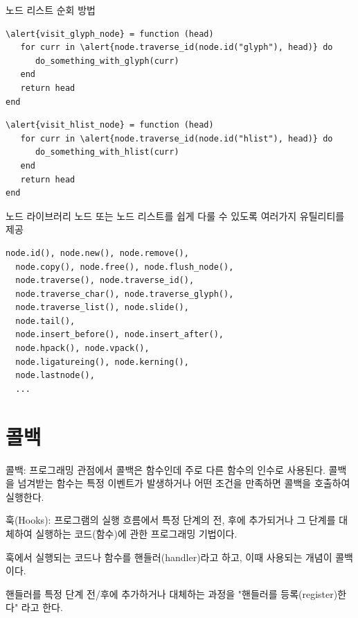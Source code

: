 \documentclass[t,10pt]{beamer}
\begin{document}
\begin{frame}[fragile]{노드 리스트 순회 방법}
\begin{Verbatim}[fontsize=\small,commandchars=\\\{\}]
\alert{visit_glyph_node} = function (head)
   for curr in \alert{node.traverse_id(node.id("glyph"), head)} do
      do_something_with_glyph(curr)
   end
   return head
end
\end{Verbatim}

\begin{Verbatim}[fontsize=\small,commandchars=\\\{\}]
\alert{visit_hlist_node} = function (head)
   for curr in \alert{node.traverse_id(node.id("hlist"), head)} do
      do_something_with_hlist(curr)
   end
   return head
end
\end{Verbatim}
\end{frame}

\begin{frame}[fragile]{노드 라이브러리}
  노드 또는 노드 리스트를 쉽게 다룰 수 있도록 여러가지 유틸리티를 제공

\begin{Verbatim}[fontsize=\small]
  node.id(), node.new(), node.remove(),
  node.copy(), node.free(), node.flush_node(),
  node.traverse(), node.traverse_id(),
  node.traverse_char(), node.traverse_glyph(),
  node.traverse_list(), node.slide(),
  node.tail(),
  node.insert_before(), node.insert_after(),
  node.hpack(), node.vpack(),
  node.ligatureing(), node.kerning(),
  node.lastnode(),
  ...
\end{Verbatim}
\end{frame}

\section{콜백}

\begin{frame}[fragile]{콜백: 프로그래밍 관점에서}
  콜백은 함수인데 주로 다른 함수의 인수로 사용된다. 콜백을 넘겨받는 함수는
  특정 이벤트가 발생하거나 어떤 조건을 만족하면 콜백을 호출하여 실행한다.

  \alert{훅(Hooks)}: 프로그램의 실행 흐름에서 특정 단계의 전, 후에 추가되거나
  그 단계를 대체하여 실행하는 코드(함수)에 관한 프로그래밍 기법이다.

  훅에서 실행되는 코드나 함수를 \alert{핸들러(handler)}라고 하고, 이때 사용되는
  개념이 콜백이다.

  핸들러를 특정 단계 전/후에 추가하거나 대체하는 과정을 "\alert{핸들러를
    등록(register)한다}" 라고 한다.
\end{frame}
\end{document}
